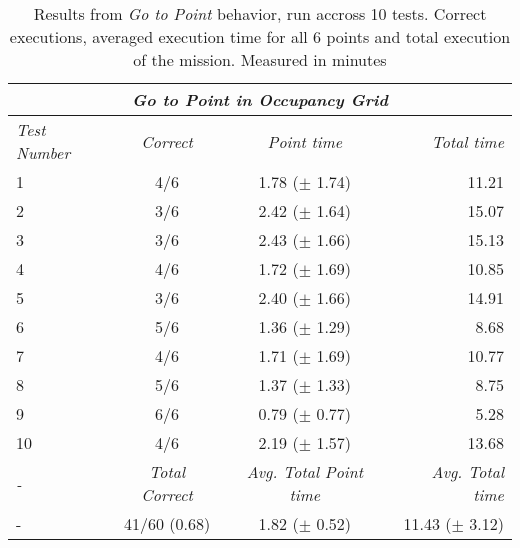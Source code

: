 \begin{table}[!h]
  \centering
  \begin{tabular}{lccr} \toprule
    \multicolumn{4}{c}{\textit{Go to Point in Occupancy Grid}}                        \\ \midrule
    \textit{Test Number} & \textit{Correct} & \textit{Point time} & \textit{Total time} \\ \midrule
      1 & 4/6 & 1.78 ($\pm$ 1.74) & 11.21 \\ \hline
      2 & 3/6 & 2.42 ($\pm$ 1.64) & 15.07 \\ \hline
      3 & 3/6 & 2.43 ($\pm$ 1.66) & 15.13 \\ \hline
      4 & 4/6 & 1.72 ($\pm$ 1.69) & 10.85 \\ \hline
      5 & 3/6 & 2.40 ($\pm$ 1.66) & 14.91 \\ \hline
      6 & 5/6 & 1.36 ($\pm$ 1.29) & 8.68 \\ \hline
      7 & 4/6 & 1.71 ($\pm$ 1.69) & 10.77 \\ \hline
      8 & 5/6 & 1.37 ($\pm$ 1.33) & 8.75 \\ \hline
      9 & 6/6 & 0.79 ($\pm$ 0.77) & 5.28 \\ \hline
      10 & 4/6 & 2.19 ($\pm$ 1.57) & 13.68 \\ \hline
      \textit{-} & \textit{Total Correct} & \textit{Avg. Total Point time} & \textit{Avg. Total time} \\ \midrule
      - & 41/60 (0.68) & 1.82 ($\pm$ 0.52) & 11.43 ($\pm$ 3.12) \\ \bottomrule
      \hline
  \end{tabular}
  \caption{Results from \textit{Go to Point} behavior, run accross 10 tests. Correct executions, averaged execution time for all 6 points and total execution of the mission. Measured in minutes}
  \label{ch_5:table:go_to_point_results}
\end{table}
